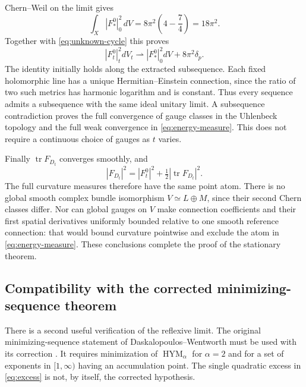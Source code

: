 \documentclass[11pt]{amsart}
\theoremstyle{definition}
\theoremstyle{remark}
\newcommand{\tr}{\operatorname{tr}}
\newcommand{\HYM}{\operatorname{HYM}}
\begin{document}
Chern--Weil on the limit gives
\[
 \int_X|F_*^0|_0^2\,dV
 =8\pi^2\left(4-\frac74\right)=18\pi^2.
\]
Together with \eqref{eq:unknown-cycle} this proves
\begin{equation}\label{eq:energy-measure}
 |F_t^0|_t^2dV_t\rightharpoonup |F_*^0|_0^2dV+8\pi^2\delta_p.
\end{equation}
The identity initially holds along the extracted subsequence. Each fixed
holomorphic line has a unique Hermitian--Einstein connection, since the
ratio of two such metrics has harmonic logarithm and is constant. Thus
every sequence admits a subsequence with the same ideal unitary limit.
A subsequence contradiction proves the full convergence of gauge classes
in the Uhlenbeck topology and the full weak convergence in
\eqref{eq:energy-measure}. This does not require a continuous choice of
gauges as $t$ varies.

Finally $\tr F_{D_t}$ converges smoothly, and
\[
 |F_{D_t}|^2=|F_t^0|^2+\tfrac12|\tr F_{D_t}|^2.
\]
The full curvature measures therefore have the same point atom.
There is no global smooth complex bundle isomorphism $V\simeq L\oplus M$,
since their second Chern classes differ. Nor can global gauges on $V$
make connection coefficients and their first spatial derivatives uniformly
bounded relative to one smooth reference connection: that would bound
curvature pointwise and exclude the atom in \eqref{eq:energy-measure}.
These conclusions complete the proof of the stationary theorem.

\subsection{Compatibility with the corrected minimizing-sequence theorem}
There is a second useful verification of the reflexive limit. The original
minimizing-sequence statement of Daskalopoulos--Wentworth must be used with
its correction \cite{daskalopouloswentworth2004,daskalopouloswentworth2007}.
It requires minimization of $\HYM_\alpha$ for $\alpha=2$ and for a set
of exponents in $[1,\infty)$ having an accumulation point. The single
quadratic excess in \eqref{eq:excess} is not, by itself, the corrected
hypothesis.
\end{document}
